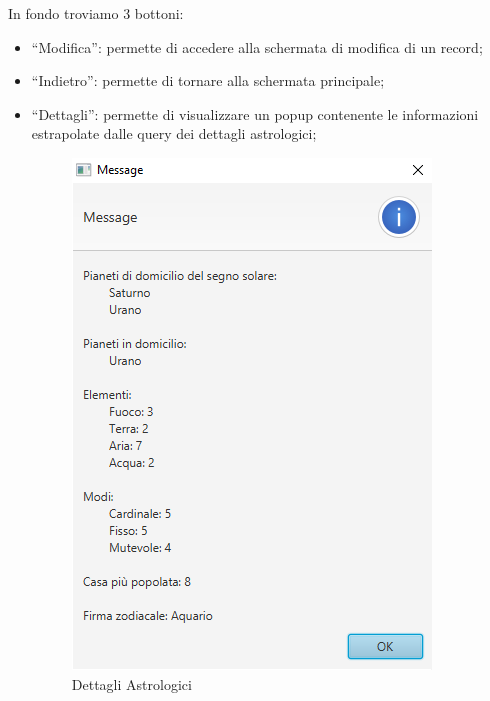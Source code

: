 In fondo troviamo 3 bottoni:
\begin{itemize}
  \item “Modifica”: permette di accedere alla schermata di modifica di un record;
  \item “Indietro”: permette di tornare alla schermata principale;
  \item “Dettagli”: permette di visualizzare un popup contenente le informazioni estrapolate dalle query dei dettagli astrologici;
  \begin{figure}[H]
  \centering
  \includegraphics[width=\textwidth, height=0.35\textheight, keepaspectratio]{img/c5/DetailsPopup.png}
  \caption{Dettagli Astrologici}
  \label{fig:astrdet}
  \end{figure}
\end{itemize}


